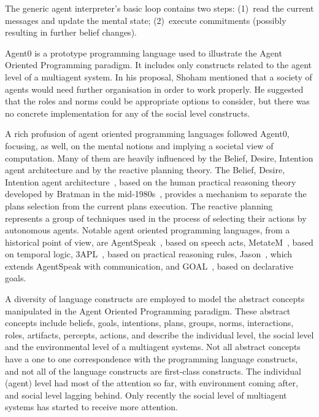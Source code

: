 \documentclass[a4paper,12pt,oneside,fleqn]{book} %
\begin{document}
The generic agent interpreter's basic loop contains two steps: (1)~read
the current messages and update the mental state; (2)~execute commitments
(possibly resulting in further belief changes).

Agent0 is a prototype programming language used to illustrate the Agent
Oriented Programming paradigm. It includes only constructs related to the
agent level of a multiagent system. In his proposal, Shoham mentioned that
a society of agents would need further organisation in order to work
properly. He suggested that the roles and norms could be appropriate
options to consider, but there was no concrete implementation for any of
the social level constructs.

A rich profusion of agent oriented programming languages followed Agent0,
focusing, as well, on the mental notions and implying a societal view of
computation.  Many of them are heavily influenced by the Belief, Desire,
Intention agent architecture and by the reactive planning theory.  The
Belief, Desire, Intention agent architecture~\cite{DBLP:conf/icmas/RaoG95},
based on the human practical reasoning theory developed by Bratman in the
mid-1980s~\cite{Bratman:1999}, provides a mechanism to separate the plans
selection from the current plans execution.  The reactive
planning~\cite{DBLP:conf/aaai/GeorgeffL87} represents a group of techniques
used in the process of selecting their actions by autonomous agents.
Notable agent oriented programming languages, from a historical point of
view, are AgentSpeak~\cite{DBLP:conf/maamaw/Rao96}, based on speech acts,
MetateM~\cite{DBLP:conf/promas/Fisher05}, based on temporal logic,
3APL~\cite{DBLP:conf/promas/DastaniRDM03}, based on practical reasoning
rules, Jason~\cite{DBLP:books/sp/map2005/BordiniHV05}, which extends
AgentSpeak with communication, and
GOAL~\cite{DBLP:journals/corr/cs-AI-0207008}, based on declarative goals.

A diversity of language constructs are employed to model the abstract
concepts manipulated in the Agent Oriented Programming paradigm. These
abstract concepts include beliefs, goals, intentions, plans, groups, norms,
interactions, roles, artifacts, percepts, actions, and describe the
individual level, the social level and the environmental level of a
multiagent systems. Not all abstract concepts have a one to one
correspondence with the programming language constructs, and not all of the
language constructs are first-class constructs. The individual (agent) level
had most of the attention so far, with environment coming after, and social
level lagging behind. Only recently the social level of multiagent systems
has started to receive more attention.
\end{document}
